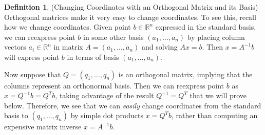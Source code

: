 \documentclass[12pt]{book}
\numberwithin{equation}{section} %
\theoremstyle{plain}
\theoremstyle{definition}
\newtheorem{defn}[thm]{Definition}
\theoremstyle{remark}
\newcommand{\Rn}{\mathbb{R}^n}
\begin{document}
\begin{defn}(Changing Coordinates with an Orthogonal Matrix and its Basis)
Orthogonal matrices make it very easy to change coordinates.
To see this, recall how we change coordinates.
Given point $b\in\Rn$ expressed in the standard basis, we can reexpress
point $b$ in some other basis $(a_1,\ldots,a_n)$ by placing column
vectors $a_i\in\Rn$ in matrix $A=(a_1,\ldots,a_n)$ and solving $Ax=b$.
Then $x=A^{-1}b$ will express point $b$ in terms of basis
$(a_1,\ldots,a_n)$.

Now suppose that $Q=(q_1,\ldots,q_n)$ is an
orthogonal matrix, implying that the columns represent an orthonormal
basis. Then we can reexpress point $b$ as $x=Q^{-1}b=Q^Tb$, taking
advantage of the result $Q^{-1}=Q^T$ that we will prove below.
Therefore, we see that we can \emph{easily} change coordinates from the
standard basis to $(q_1,\ldots,q_n)$ by simple dot products $x=Q^Tb$,
rather than computing an expensive matrix inverse $x=A^{-1}b$.
\end{defn}
\end{document}
